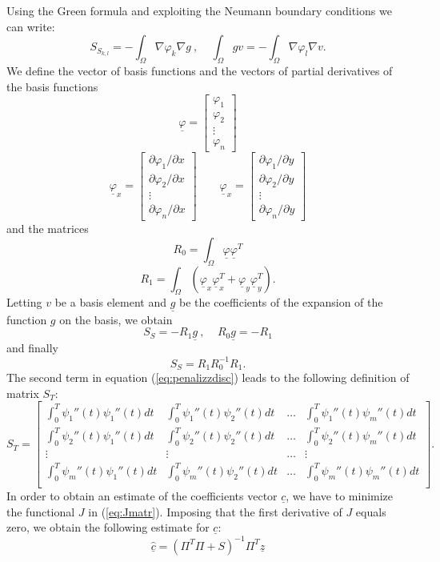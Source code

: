 \documentclass[a4paper,11pt,twoside,openright]{book}							%
\begin{document}
Using the Green formula and exploiting the Neumann boundary conditions we can write:
$$S_{S_{k,l}} = -\int_\Omega \nabla \varphi_k \nabla g \ , \ \ \ \ \ \int_\Omega g v = -\int_\Omega \nabla \varphi_l \nabla v.$$
We define the vector of basis functions and the vectors of partial derivatives of the basis functions
$$
\underline \varphi =
\begin{bmatrix}
\varphi_{1}  \\
\varphi_{2}  \\
\vdots\\
\varphi_{n}
\end{bmatrix}
$$
\begin{equation}
\underline \varphi_x=  \begin{bmatrix}
\partial \varphi_{1}/\partial x \\
\partial \varphi_{2}/\partial x  \\
\vdots\\
\partial \varphi_{n}/\partial x \end{bmatrix} 
\qquad
\underline \varphi_x=  \begin{bmatrix}
\partial \varphi_{1}/\partial y  \\
\partial \varphi_{2}/\partial y  \\
\vdots\\
\partial \varphi_{n}/\partial y\end{bmatrix} 
\end{equation}
and the matrices
$$ R_0 = \int_\Omega \underline \varphi \underline \varphi^T $$
$$ R_1 = \int_\Omega (\underline \varphi_x \underline \varphi_x^T + \underline \varphi_y \underline \varphi_y^T). $$
Letting $v$ be a basis element and $\underline g$ be the coefficients of the expansion of the function $g$ on the basis, we obtain
$$ S_S= - R_1 \underline g \ , \ \ \ \ \ R_0 \underline g = - R_1  $$
and finally
$$ S_S = R_1 R_0^{-1} R_1 .$$
The second term in equation (\ref{eq:penalizzdisc}) leads to the following definition of matrix $S_T$:
$$ S_T = \begin{bmatrix}
\int_0^T \psi_1''(t) \psi_1''(t) dt  & \int_0^T \psi_1''(t) \psi_2''(t) dt & \hdots & \int_0^T \psi_1''(t) \psi_m''(t) dt  \\
\int_0^T \psi_2''(t) \psi_1''(t) dt  & \int_0^T \psi_2''(t) \psi_2''(t) dt & \hdots & \int_0^T \psi_2''(t) \psi_m''(t) dt  \\
\vdots & \vdots & \hdots & \vdots \\
\int_0^T \psi_m''(t) \psi_1''(t) dt  & \int_0^T \psi_m''(t) \psi_2''(t) dt & \hdots & \int_0^T \psi_m''(t) \psi_m''(t) dt  \\
\end{bmatrix} .$$
In order to obtain an estimate of the coefficients vector $\underline c$, we have to minimize the functional $J$ in (\ref{eq:Jmatr}). Imposing that the first derivative of $J$ equals zero, we obtain the following estimate for $\underline c$:
$$ \hat  {\underline c} = (\Pi^T \Pi + S)^{-1}\Pi^T \underline z$$
\end{document}
